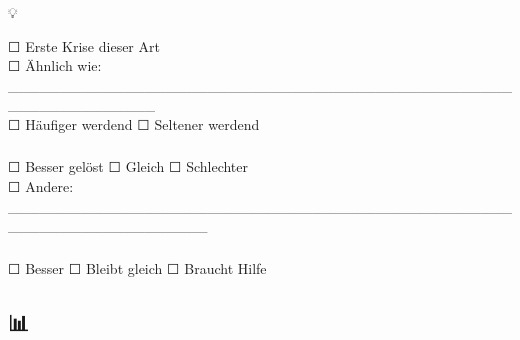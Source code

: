 💡 \textcolor{ctmmGreen}{\textit{\1}}

☐ Erste Krise dieser Art\\
☐ Ähnlich wie: \_\_\_\_\_\_\_\_\_\_\_\_\_\_\_\_\_\_\_\_\_\_\_\_\_\_\_\_\_\_\_\_\_\_\_\_\_\_\_\_\_\_\_\_\_\_\_\_\_\_\_\_\_\_\_\_\_\_\_\_\_\_\\
☐ Häufiger werdend ☐ Seltener werdend

\hfill\break
\hfill\break

\hypertarget{verbesserung-zu-letztem-mal}{%
\subsubsection[\textbf{\textcolor{ctmmBlue}{\1}}]{\texorpdfstring{\protect\hypertarget{verbesserung-zu-letztem-mal}{}{}\textbf{\textcolor{ctmmBlue}{\1}}}{Verbesserung zu letztem Mal:}}\label{verbesserung-zu-letztem-mal}}

☐ Besser gelöst ☐ Gleich ☐ Schlechter\\
☐ Andere: \_\_\_\_\_\_\_\_\_\_\_\_\_\_\_\_\_\_\_\_\_\_\_\_\_\_\_\_\_\_\_\_\_\_\_\_\_\_\_\_\_\_\_\_\_\_\_\_\_\_\_\_\_\_\_\_\_\_\_\_\_\_\_\_\_\_\_

\hfill\break
\hfill\break

\hypertarget{unser-krisenmanagement-wird}{%
\subsubsection[\textbf{\textcolor{ctmmBlue}{\1}}]{\texorpdfstring{\protect\hypertarget{unser-krisenmanagement-wird}{}{}\textbf{\textcolor{ctmmBlue}{\1}}}{Unser Krisenmanagement wird:}}\label{unser-krisenmanagement-wird}}

☐ Besser ☐ Bleibt gleich ☐ Braucht Hilfe

\hfill\break
\hfill\break

\hypertarget{bewertung}{%
\subsection[📊 \ul{\textbf{\textcolor{ctmmBlue}{\1}}}]{\texorpdfstring{\protect\hypertarget{bewertung}{}{}📊 \ul{\textbf{\textcolor{ctmmBlue}{\1}}}}{📊 BEWERTUNG}}\label{bewertung}}

\hypertarget{krise-geluxf6st-1-10}{%
\subsubsection[\textbf{\textcolor{ctmmBlue}{\1}} \textbf{\textcolor{ctmmBlue}{\1}}]{\texorpdfstring{\protect\hypertarget{krise-geluxf6st-1-10}{}{}\textbf{\textcolor{ctmmBlue}{\1}} \textbf{\textcolor{ctmmBlue}{\1}}}{Krise gelöst (1-10):}}\label{krise-geluxf6st-1-10}}

